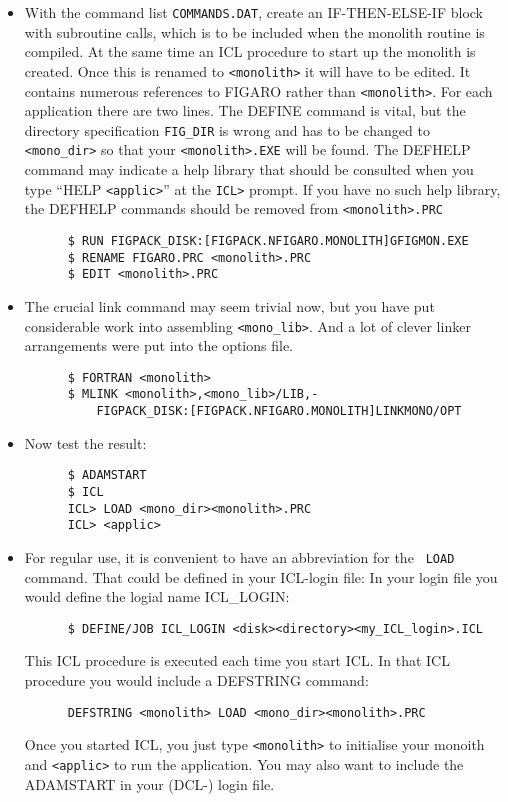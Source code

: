 \begin{itemize}
\item With the command list {\tt COMMANDS.DAT}, create an IF-THEN-ELSE-IF block
with subroutine calls, which is to be included when the monolith routine is
compiled. At the same time an ICL procedure to start up the monolith is
created. Once this is renamed to {\tt <monolith>} it will have to be edited. It
contains numerous references to FIGARO rather than {\tt <monolith>}. For each
application there are two lines. The DEFINE command is vital, but the directory
specification {\tt FIG\_DIR} is wrong and has to be changed to {\tt
<mono\_dir>} so that your {\tt <monolith>.EXE} will be found. The DEFHELP
command may indicate a help library that should be consulted when you type
``HELP {\tt <applic>}'' at the {\tt ICL>} prompt. If you have no such help
library, the DEFHELP commands should be removed from {\tt <monolith>.PRC}

\begin{verbatim}
      $ RUN FIGPACK_DISK:[FIGPACK.NFIGARO.MONOLITH]GFIGMON.EXE
      $ RENAME FIGARO.PRC <monolith>.PRC
      $ EDIT <monolith>.PRC
\end{verbatim}

\item The crucial link
command may seem trivial now, but you have put considerable work into
assembling {\tt <mono\_lib>}. And a lot of clever linker arrangements were put
into the options file.

\begin{verbatim}
      $ FORTRAN <monolith>
      $ MLINK <monolith>,<mono_lib>/LIB,-
          FIGPACK_DISK:[FIGPACK.NFIGARO.MONOLITH]LINKMONO/OPT
\end{verbatim}

\item Now test the result:

\begin{verbatim}
      $ ADAMSTART
      $ ICL
      ICL> LOAD <mono_dir><monolith>.PRC
      ICL> <applic>
\end{verbatim}

\item For regular use, it is convenient to have an abbreviation for the {\tt
LOAD} command. That could be defined in your ICL-login file: In your login
file you would define the logial name ICL\_LOGIN:

\begin{verbatim}
      $ DEFINE/JOB ICL_LOGIN <disk><directory><my_ICL_login>.ICL
\end{verbatim}

This ICL procedure is executed each time you start ICL. In that ICL procedure
you would include a DEFSTRING command:

\begin{verbatim}
      DEFSTRING <monolith> LOAD <mono_dir><monolith>.PRC
\end{verbatim}

Once you started ICL, you just type {\tt <monolith>} to initialise your monoith
and {\tt <applic>} to run the application. You may also want to include the
ADAMSTART in your (DCL-) login file.

\end{itemize}

